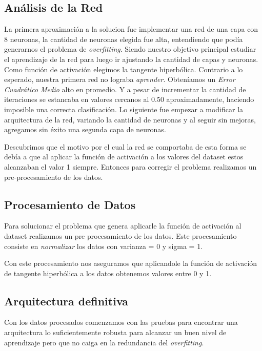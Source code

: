 \documentclass[onecolumn,10pt]{article}
\begin{document}
\subsection{Análisis de la Red}

La primera aproximación a la solucion fue implementar una red de una
capa con 8 neuronas, la cantidad de neuronas elegida fue alta, 
entendiendo que podía generarnos el problema de \emph{overfitting}.
Siendo nuestro objetivo principal estudiar el aprendizaje de la red
para luego ir ajustando la cantidad de capas y neuronas.
Como función de activación elegimos la tangente hiperbólica. 
Contrario a lo esperado, nuestra primera red no lograba \emph{aprender}.
Obteníamos un \emph{Error Cuadrático Medio} alto en promedio. Y a pesar
de incrementar la cantidad de iteraciones se estancaba en valores
cercanos al 0.50 aproximadamente, haciendo imposible una correcta
clasificación.
Lo siguiente fue empezar a modificar la arquitectura de la red,
variando la cantidad de neuronas y al seguir sin mejoras, agregamos
sin éxito una segunda capa de neuronas.

Descubrimos que el motivo por el cual la red se comportaba de esta
forma se debía a que al aplicar la función de activación a los valores
del dataset estos alcanzaban el valor 1 siempre. Entonces para corregir
el problema realizamos un pre-procesamiento de los datos.


\subsection{Procesamiento de Datos}

Para solucionar el problema que genera aplicarle la función de activación
al dataset realizamos un pre procesamiento de los datos.
Este procesamiento consiste en \emph{normalizar} los datos con varianza = 0 y
sigma = 1.

Con este procesamiento nos aseguramos que aplicandole la función de
activación de tangente hiperbólica a los datos obtenemos valores entre
0 y 1.

\subsection{Arquitectura definitiva}

Con los datos procesados comenzamos con las pruebas para encontrar
una arquitectura lo suficientemente robusta para alcanzar un buen nivel
de aprendizaje pero que no caiga en la redundancia del \emph{overfitting}.
\end{document}
